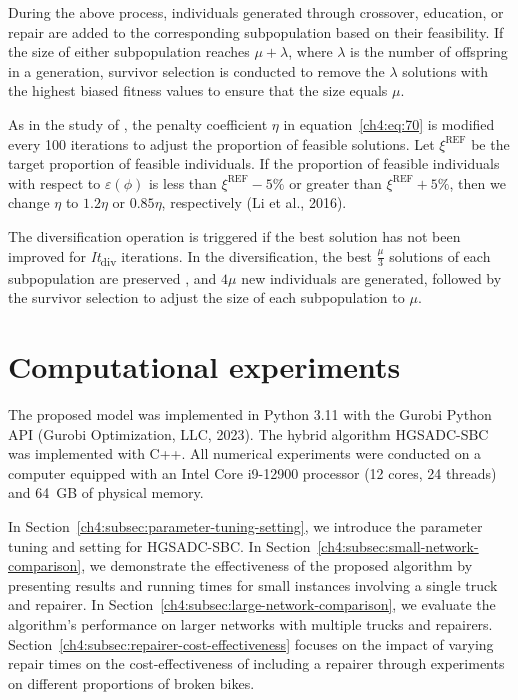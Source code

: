During the above process, individuals generated through crossover, education, or repair are added to
the corresponding subpopulation based on their feasibility. If the size of either subpopulation
reaches \(\mu + \lambda\), where \(\lambda\) is the number of offspring in a generation, survivor
selection is conducted to remove the \(\lambda\) solutions with the highest biased fitness values to
ensure that the size equals \(\mu\).

As in the study of \citet{liMultipleTypeBike2016}, the penalty coefficient \(\eta\) in equation~\eqref{ch4:eq:70} is modified every
100 iterations to adjust the proportion of feasible solutions. Let \(\xi^{\text{REF}}\) be the
target proportion of feasible individuals. If the proportion of feasible individuals with respect to
\(\varepsilon(\phi)\) is less than \(\xi^{\text{REF}} - 5\%\) or greater than
\(\xi^{\text{REF}} + 5\%\), then we change \(\eta\) to \(1.2\eta\) or \(0.85\eta\), respectively (Li
et al., 2016).

The diversification operation is triggered if the best solution has not been improved for
\emph{It}\textsubscript{div} iterations. In the diversification, the best \(\frac{\mu}{3}\)
solutions of each subpopulation are preserved \citep{liMultipleTypeBike2016}, and \(4\mu\) new individuals are
generated, followed by the survivor selection to adjust the size of each subpopulation to \(\mu\).

\section{Computational experiments}\label{ch4:sec:computational-experiments}

The proposed model was implemented in Python 3.11 with the Gurobi Python API
(Gurobi Optimization, LLC, 2023). The hybrid algorithm HGSADC-SBC was
implemented with C++. All numerical experiments were
conducted on a computer equipped with an Intel Core i9-12900 processor (12 cores, 24 threads) and
64~GB of physical memory.

In Section~\ref{ch4:subsec:parameter-tuning-setting}, we introduce the parameter tuning and setting for HGSADC-SBC. In Section~\ref{ch4:subsec:small-network-comparison}, we
demonstrate the effectiveness of the proposed algorithm by presenting results and running times for
small instances involving a single truck and repairer. In Section~\ref{ch4:subsec:large-network-comparison}, we evaluate the algorithm's
performance on larger networks with multiple trucks and repairers. Section~\ref{ch4:subsec:repairer-cost-effectiveness} focuses on the impact
of varying repair times on the cost-effectiveness of including a repairer through experiments on
different proportions of broken bikes.

